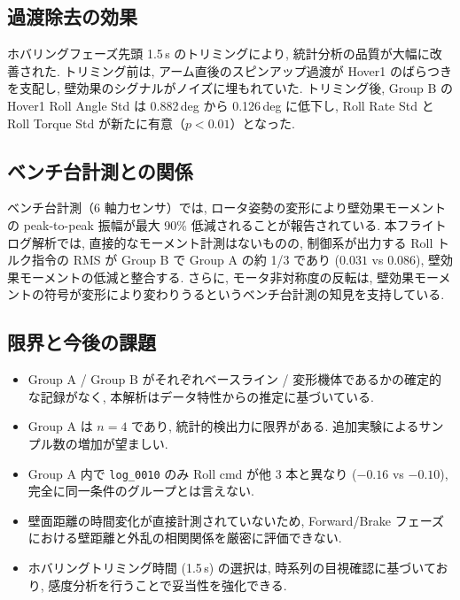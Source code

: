 \documentclass[11pt,a4paper]{ltjsarticle}
\begin{document}
\subsection{過渡除去の効果}

ホバリングフェーズ先頭 1.5\,s のトリミングにより, 統計分析の品質が大幅に改善された. トリミング前は, アーム直後のスピンアップ過渡が Hover1 のばらつきを支配し, 壁効果のシグナルがノイズに埋もれていた. トリミング後, Group B の Hover1 Roll Angle Std は 0.882\,deg から 0.126\,deg に低下し, Roll Rate Std と Roll Torque Std が新たに有意（$p < 0.01$）となった.

\subsection{ベンチ台計測との関係}

ベンチ台計測（6 軸力センサ）では, ロータ姿勢の変形により壁効果モーメントの peak-to-peak 振幅が最大 90\% 低減されることが報告されている. 本フライトログ解析では, 直接的なモーメント計測はないものの, 制御系が出力する Roll トルク指令の RMS が Group B で Group A の約 1/3 であり ($0.031$ vs $0.086$), 壁効果モーメントの低減と整合する. さらに, モータ非対称度の反転は, 壁効果モーメントの符号が変形により変わりうるというベンチ台計測の知見を支持している.

\subsection{限界と今後の課題}

\begin{itemize}
    \item Group A / Group B がそれぞれベースライン / 変形機体であるかの確定的な記録がなく, 本解析はデータ特性からの推定に基づいている.
    \item Group A は $n = 4$ であり, 統計的検出力に限界がある. 追加実験によるサンプル数の増加が望ましい.
    \item Group A 内で \texttt{log\_0010} のみ Roll cmd が他 3 本と異なり ($-0.16$ vs $-0.10$), 完全に同一条件のグループとは言えない.
    \item 壁面距離の時間変化が直接計測されていないため, Forward/Brake フェーズにおける壁距離と外乱の相関関係を厳密に評価できない.
    \item ホバリングトリミング時間 (1.5\,s) の選択は, 時系列の目視確認に基づいており, 感度分析を行うことで妥当性を強化できる.
\end{itemize}
\end{document}
